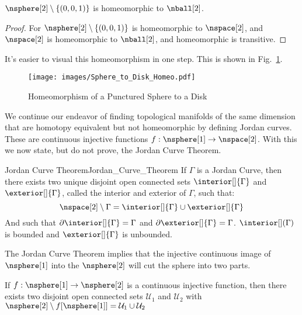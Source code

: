         \begin{theorem}
            $\nsphere[2]\setminus\{(0,0,1)\}$ is homeomorphic to
            $\nball[2]$.
        \end{theorem}
        \begin{proof}
            For $\nsphere[2]\setminus\{(0,0,1)\}$ is homeomorphic to
            $\nspace[2]$, and $\nspace[2]$ is homeomorphic to
            $\nball[2]$, and homeomorphic is transitive.
        \end{proof}
        It's easier to visual this homeomorphism in one step. This is
        shown in Fig.~\ref{fig:homeo_Punc_S2_and_Plane}.
        \begin{figure}[H]
            \centering
            \captionsetup{type=figure}
            \texttt{[image: images/Sphere\_to\_Disk\_Homeo.pdf]}
            \caption{Homeomorphism of a Punctured Sphere to a Disk}
            \label{fig:homeo_Punc_S2_and_Plane}
        \end{figure}
        We continue our endeavor of finding topological manifolds of the
        same dimension that are homotopy equivalent but not homeomorphic
        by defining Jordan curves. These are continuous injective
        functions
        $f:\nsphere[1]\rightarrow\nspace[2]$. With this we now state,
        but do not prove, the Jordan Curve Theorem.
        \begin{ftheorem}{Jordan Curve Theorem}{Jordan_Curve_Theorem}
            If $\Gamma$ is a Jordan Curve, then there exists two unique
            disjoint open connected sets $\interior[]{\Gamma}$ and
            $\exterior[]{\Gamma}$, called the interior and exterior of
            $\Gamma$, such that:
            \begin{equation*}
                \nspace[2]\setminus\Gamma
                    =\interior[]{\Gamma}\cup\exterior[]{\Gamma}
            \end{equation*}
            And such that $\partial\interior[]{\Gamma}=\Gamma$ and
            $\partial\exterior[]{\Gamma}=\Gamma$. $\interior[](\Gamma)$
            is bounded and $\exterior[]{\Gamma}$ is unbounded.
        \end{ftheorem}
        The Jordan Curve Theorem implies that the injective continuous
        image of $\nsphere[1]$ into the $\nsphere[2]$ will cut the
        sphere into two parts.
        \begin{theorem}
            \label{thm:Sphere_Without_Circle_Is_Disconnected}
            If $f:\nsphere[1]\rightarrow\nsphere[2]$ is a continuous
            injective function, then there exists two disjoint open
            connected sets $\mathcal{U}_{1}$ and $\mathcal{U}_{2}$ with
            $\nsphere[2]\setminus{f}[\nsphere[1]]%
            =\mathcal{U}_{1}\cup\mathcal{U}_{2}$
        \end{theorem}
